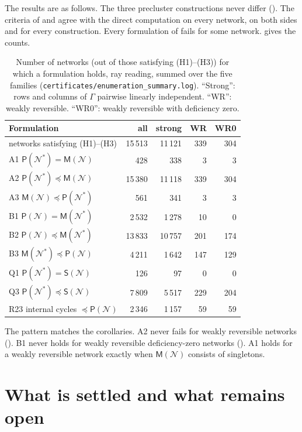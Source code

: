 \documentclass[11pt,a4paper]{report}
\newcommand{\Net}{\mathcal{N}}
\newcommand{\Pre}{\mathsf{P}}
\newcommand{\Mips}{\mathsf{M}}
\newcommand{\Sip}{\mathsf{S}}
\newcommand{\refi}{\preceq}
\begin{document}
The results are as follows. The three precluster constructions never differ (). The criteria of
 and  agree with the direct computation on every network, on both sides and for
every construction. Every formulation of  fails for some network.  gives the
counts.

\begin{table}[ht]
\centering
\caption{Number of networks (out of those satisfying (H1)--(H3)) for which a formulation holds, ray reading, summed
over the five families (\texttt{certificates/enumeration\_summary.log}). ``Strong'': rows and columns of \(\Gamma\)
pairwise linearly independent. ``WR'': weakly reversible. ``WR0'': weakly reversible with deficiency zero.}\label{tab:enum}
\small
\begin{tabular}{p{6.6cm}rrrr}
\hline
Formulation & all & strong & WR & WR0 \\
\hline
networks satisfying (H1)--(H3) & 15\,513 & 11\,121 & 339 & 304 \\
A1 \(\Pre(\Net^*)=\Mips(\Net)\) & 428 & 338 & 3 & 3 \\
A2 \(\Pre(\Net^*)\refi\Mips(\Net)\) & 15\,380 & 11\,118 & 339 & 304 \\
A3 \(\Mips(\Net)\refi\Pre(\Net^*)\) & 561 & 341 & 3 & 3 \\
B1 \(\Pre(\Net)=\Mips(\Net^*)\) & 2\,532 & 1\,278 & 10 & 0 \\
B2 \(\Pre(\Net)\refi\Mips(\Net^*)\) & 13\,833 & 10\,757 & 201 & 174 \\
B3 \(\Mips(\Net^*)\refi\Pre(\Net)\) & 4\,211 & 1\,642 & 147 & 129 \\
Q1 \(\Pre(\Net^*)=\Sip(\Net)\) & 126 & 97 & 0 & 0 \\
Q3 \(\Pre(\Net^*)\refi\Sip(\Net)\) & 7\,809 & 5\,517 & 229 & 204 \\
R23 internal cycles \(\refi\Pre(\Net)\) & 2\,346 & 1\,157 & 59 & 59 \\
\hline
\end{tabular}
\end{table}

The pattern matches the corollaries. A2 never fails for weakly reversible networks (). B1 never holds
for weakly reversible deficiency-zero networks (). A1 holds for a weakly reversible network exactly
when \(\Mips(\Net)\) consists of singletons.

\section{What is settled and what remains open}
\end{document}
